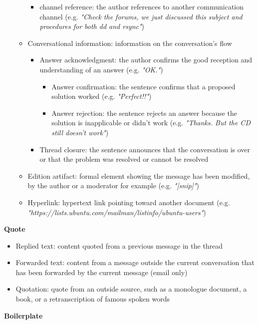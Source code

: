 \documentclass[11pt]{article}
\begin{document}
\begin{itemize}
\begin{itemize}
\begin{itemize}
					\item channel reference: the author references to another communication channel (e.g. \textit{"Check the forums, we just discussed this subject and procedures for both dd and rsync"})
				\end{itemize}
			\item Conversational information: information on the conversation's flow
				\begin{itemize}
					\item Answer acknowledgment: the author confirms the good reception and understanding of an answer (e.g. \textit{"OK."})
						\begin{itemize}
							\item Answer confirmation: the sentence confirms that a proposed solution worked (e.g. \textit{"Perfect!!"})
							\item Answer rejection: the sentence rejects an answer because the solution is inapplicable or didn't work (e.g. \textit{"Thanks. But the CD still doesn't work"})
						\end{itemize}
					\item Thread closure: the sentence announces that the conversation is over or that the problem was resolved or cannot be resolved
				\end{itemize}
			\item Edition artifact: formal element showing the message has been modified, by the author or a moderator for example (e.g. \textit{"[snip]"})
			\item Hyperlink: hypertext link pointing toward another document (e.g. \textit{"https://lists.ubuntu.com/mailman/listinfo/ubuntu-users"})
		\end{itemize}
\end{itemize}

\textbf{Quote}

\begin{itemize}
	\item Replied text: content quoted from a previous message in the thread
	\item Forwarded text: content from a message outside the current conversation that has been forwarded by the current message (email only)
	\item Quotation: quote from an outside source, such as a monologue document, a book, or a retranscription of famous spoken words
\end{itemize}

\textbf{Boilerplate}
\end{document}
